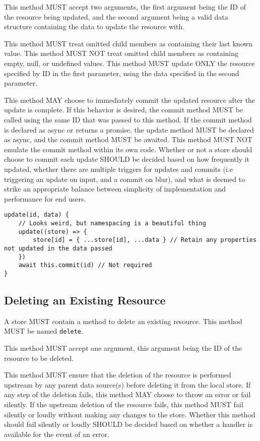 \documentclass{article}
\begin{document}
This method MUST accept two arguments, the first argument being the ID of the resource being updated, and the second argument being a valid data structure containing the data to update the resource with.

This method MUST treat omitted child members as containing their last known value. This method MUST NOT treat omitted child members as containing empty, null, or undefined values. This method MUST update ONLY the resource specified by ID in the first parameter, using the data specified in the second parameter.

This method MAY choose to immediately commit the updated resource after the update is complete. If this behavior is desired, the commit method MUST be called using the same ID that was passed to this method. If the commit method is declared as async or returns a promise, the update method MUST be declared as async, and the commit method MUST be awaited. This method MUST NOT emulate the commit method within its own code. Whether or not a store should choose to commit each update SHOULD be decided based on how frequently it updated, whether there are multiple triggers for updates and commits (i.e triggering an update on input, and a commit on blur), and what is deemed to strike an appropriate balance between simplicity of implementation and performance for end users.

\begin{lstlisting}[caption=Update Method]
update(id, data) {
    // Looks weird, but namespacing is a beautiful thing
    update((store) => {
        store[id] = { ...store[id], ...data } // Retain any properties not updated in the data passed
    })
    await this.commit(id) // Not required
}
\end{lstlisting}

\subsection{Deleting an Existing Resource}
A store MUST contain a method to delete an existing resource. This method MUST be named \verb|delete|.

This method MUST accept one argument, this argument being the ID of the resource to be deleted.

This method MUST ensure that the deletion of the resource is performed upstream by any parent data source(s) before deleting it from the local store. If any step of the deletion fails, this method MAY choose to throw an error or fail silently. If the upstream deletion of the resource fails, this method MUST fail silently or loudly without making any changes to the store. Whether this method should fail silently or loudly SHOULD be decided based on whether a handler is available for the event of an error.
\end{document}
